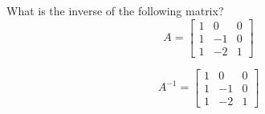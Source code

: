 \begin{pro}
  What is the inverse of the following matrix?
  \begin{displaymath}
    A =
    \begin{bmatrix}
      1 & 0 & 0\\
      1 & -1 & 0 \\
      1 & -2 & 1
    \end{bmatrix}
  \end{displaymath}
\end{pro}

\begin{sol}
  \begin{displaymath}
    A^{-1} =
    \begin{bmatrix}
            1 & 0 & 0\\
      1 & -1 & 0 \\
      1 & -2 & 1
    \end{bmatrix}
  \end{displaymath}
\end{sol}
